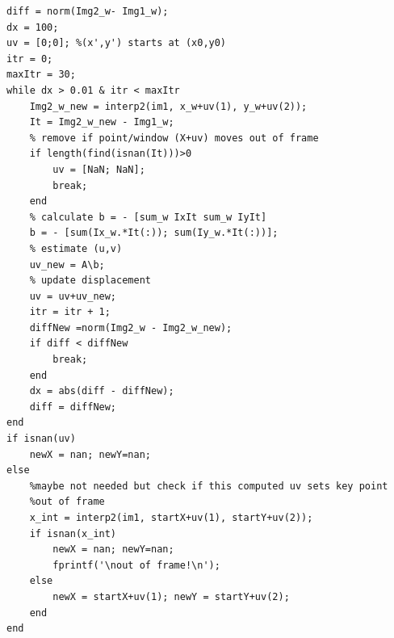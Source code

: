 \begin{verbatim}
diff = norm(Img2_w- Img1_w);
dx = 100;
uv = [0;0]; %(x',y') starts at (x0,y0) 
itr = 0;
maxItr = 30;
while dx > 0.01 & itr < maxItr
    Img2_w_new = interp2(im1, x_w+uv(1), y_w+uv(2));
    It = Img2_w_new - Img1_w;    
    % remove if point/window (X+uv) moves out of frame
    if length(find(isnan(It)))>0
        uv = [NaN; NaN];
        break;
    end
    % calculate b = - [sum_w IxIt sum_w IyIt]
    b = - [sum(Ix_w.*It(:)); sum(Iy_w.*It(:))];
    % estimate (u,v)
    uv_new = A\b;
    % update displacement
    uv = uv+uv_new;
    itr = itr + 1;
    diffNew =norm(Img2_w - Img2_w_new);
    if diff < diffNew
        break;
    end
    dx = abs(diff - diffNew);
    diff = diffNew;
end
if isnan(uv)
    newX = nan; newY=nan;
else 
    %maybe not needed but check if this computed uv sets key point
    %out of frame
    x_int = interp2(im1, startX+uv(1), startY+uv(2));
    if isnan(x_int)
        newX = nan; newY=nan;
        fprintf('\nout of frame!\n');
    else
        newX = startX+uv(1); newY = startY+uv(2);
    end
end
\end{verbatim}

